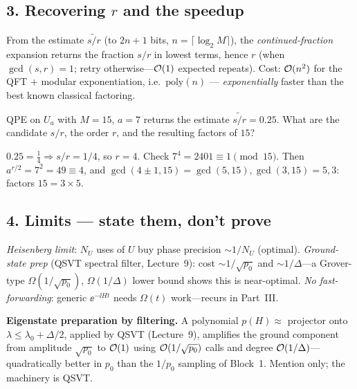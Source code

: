 \documentclass[11pt]{article}
\begin{document}
\subsection*{3. Recovering $r$ and the speedup }
\begin{board}
From the estimate $\widetilde{s/r}$ (to $2n+1$ bits, $n=\lceil\log_2 M\rceil$), the
\emph{continued-fraction} expansion returns the fraction $s/r$ in lowest terms, hence $r$
(when $\gcd(s,r)=1$; retry otherwise---$\mathcal{O}(1)$ expected repeats). Cost: $\mathcal{O}(n^2)$
for the QFT $+$ modular exponentiation, i.e.\ $\mathrm{poly}(n)$ --- \emph{exponentially}
faster than the best known classical factoring.
\end{board}

\begin{inclass}\label{ic:l5-cf}
QPE on $U_a$ with $M=15$, $a=7$ returns the estimate $\widetilde{s/r}=0.25$. What are the
candidate $s/r$, the order $r$, and the resulting factors of $15$?
\end{inclass}
\begin{answer}
$0.25=\tfrac14\Rightarrow s/r=1/4$, so $r=4$. Check $7^4=2401\equiv1\pmod{15}$. Then
$a^{r/2}=7^2=49\equiv4$, and $\gcd(4\pm1,15)=\gcd(5,15),\gcd(3,15)=5,3$: factors $15=3\times5$.
\end{answer}

\subsection*{4. Limits --- state them, don't prove }
\begin{board}
\emph{Heisenberg limit}: $N_U$ uses of $U$ buy phase precision $\sim1/N_U$ (optimal).
\emph{Ground-state prep} (QSVT spectral filter, Lecture~9): cost $\sim1/\sqrt{p_0}$ and
$\sim1/\Delta$---a Grover-type $\Omega(1/\sqrt{p_0})$, $\Omega(1/\Delta)$ lower bound shows
this is near-optimal. \emph{No fast-forwarding}: generic $\ee^{-\ii Ht}$ needs
$\Omega(t)$ work---recurs in Part~III.
\end{board}

\begin{advanced}
\textbf{Eigenstate preparation by filtering.} A polynomial $p(H)\approx$ projector onto
$\lambda\le\lambda_0+\Delta/2$, applied by QSVT (Lecture~9), amplifies the ground
component from amplitude $\sqrt{p_0}$ to $\mathcal{O}(1)$ using $\mathcal{O}(1/\sqrt{p_0})$ calls and
degree $\mathcal{O}(1/\Delta)$---quadratically better in $p_0$ than the $1/p_0$ sampling of
Block~1. Mention only; the machinery is QSVT.
\end{advanced}
\end{document}

